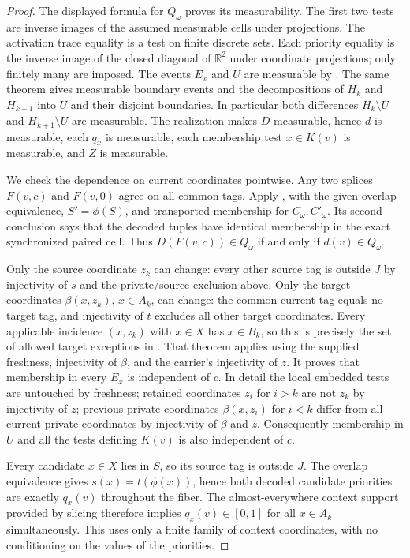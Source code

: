 \begin{proof}
The displayed formula for $Q_\omega$ proves its measurability.
The first two tests are inverse images of the assumed measurable cells
under projections. The activation trace equality is a test on finite
discrete sets. Each priority equality is the inverse image of the closed
diagonal of $\mathbb R^2$ under coordinate projections; only finitely
many are imposed. The events $E_x$ and $U$ are measurable by
.
The same theorem gives measurable boundary events and the decompositions
of $H_k$ and $H_{k+1}$ into $U$ and their disjoint boundaries. In particular
both differences $H_k\setminus U$ and $H_{k+1}\setminus U$ are measurable.
The realization makes $D$ measurable, hence $d$ is measurable, each
$q_x$ is measurable, each membership test $x\in K(v)$ is measurable,
and $Z$ is measurable.

We check the dependence on current coordinates pointwise. Any two
splices $F(v,c)$ and $F(v,0)$ agree on all common tags. Apply
, with
the given overlap equivalence, $S'=\phi(S)$, and transported membership
for $C_\omega,C'_\omega$. Its second conclusion says that the decoded
tuples have identical membership in the exact synchronized paired cell.
Thus $D(F(v,c))\in Q_\omega$ if and only if $d(v)\in Q_\omega$.

Only the source coordinate $z_k$ can change: every other source tag is
outside $J$ by injectivity of $s$ and the private/source exclusion above.
Only the target coordinates $\beta(x,z_k)$, $x\in A_k$, can change:
the common current tag equals no target tag, and injectivity of $t$
excludes all other target coordinates. Every applicable incidence
$(x,z_k)$ with $x\in X$ has $x\in B_k$, so this is precisely the set
of allowed target exceptions in
.
That theorem applies using the supplied freshness, injectivity of
$\beta$, and the carrier's injectivity of $z$. It proves that membership
in every $E_x$ is independent of $c$. In detail the local embedded tests
are untouched by freshness; retained coordinates $z_i$ for $i>k$
are not $z_k$ by injectivity of $z$; previous private coordinates
$\beta(x,z_i)$ for $i<k$ differ from all current private coordinates
by injectivity of $\beta$ and $z$. Consequently membership in $U$ and
all the tests defining $K(v)$ is also independent of $c$.

Every candidate $x\in X$ lies in $S$, so its source tag is outside $J$.
The overlap equivalence gives $s(x)=t(\phi(x))$, hence both decoded
candidate priorities are exactly $q_x(v)$ throughout the fiber.
The almost-everywhere context support provided by slicing therefore
implies $q_x(v)\in[0,1]$ for all $x\in A_k$ simultaneously. This uses
only a finite family of context coordinates, with no conditioning on
the values of the priorities.


\end{proof}
